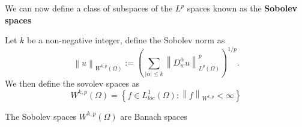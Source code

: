 \documentclass[../Main/main.tex]{subfiles}
\begin{document}
	
	We can now define a class of subspaces of the $L^p$ spaces known as the \textbf{Sobolev spaces}
	\begin{definition}
		Let $k$ be a non-negative integer, define the Sobolev norm as 
		\begin{equation*}
			\left \| u \right \|_{W^{k,p}(\Omega)} := (\sum_{|\overline{\alpha}| \leq k} \left \| D_w^{\overline{\alpha}}u \right \|_{L^p(\Omega)}^p)^{1/p}.
		\end{equation*}
		We then define the sovolev spaces as 
		\begin{equation*}
			W^{k,p}(\Omega) = \left \{  \right. f\in L^1_{loc}(\Omega):\left \| f \right \|_{W^{k,p}}<\infty\left.  \right \}
		\end{equation*}
	\end{definition}
	\begin{theorem}
		The Sobolev spaces $W^{k,p}(\Omega)$ are Banach spaces
	\end{theorem}
	
\end{document}
